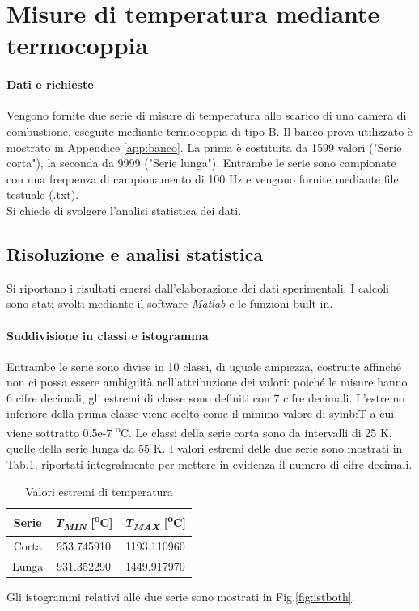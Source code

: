 \section{Misure di temperatura mediante termocoppia} \label{sez:misureT}
\paragraph{Dati e richieste}
Vengono fornite due serie di misure di temperatura allo scarico di una camera di combustione, eseguite mediante termocoppia di tipo B. Il banco prova utilizzato è mostrato in Appendice \ref{app:banco}. La prima è costituita da 1599 valori ("Serie corta"), la seconda da 9999 ("Serie lunga"). Entrambe le serie sono campionate con una frequenza di campionamento di 100 Hz e vengono fornite mediante file testuale (.txt).\\
Si chiede di svolgere l'analisi statistica dei dati.
\subsection{Risoluzione e analisi statistica}
Si riportano i risultati emersi dall'elaborazione dei dati sperimentali. I calcoli sono stati svolti mediante il software \textit{Matlab} e le funzioni built-in.
\paragraph{Suddivisione in classi e istogramma}
Entrambe le serie sono divise in 10 classi, di uguale ampiezza, costruite affinché non ci possa essere ambiguità nell'attribuzione dei valori: poiché le misure hanno 6 cifre decimali, gli estremi di classe sono definiti con 7 cifre decimali. L'estremo inferiore della prima classe viene scelto come il minimo valore di \gls{symb:T} a cui viene sottratto 0.5e-7 \textsuperscript{o}C. Le classi della serie corta sono da intervalli di 25 K, quelle della serie lunga da 55 K. I valori estremi delle due serie sono mostrati in Tab.\ref{tab:estremitemp}, riportati integralmente per mettere in evidenza il numero di cifre decimali.
\begin{table} [H]
	\centering
	\begin{tabular}{c|c|c}
		\toprule
		\toprule
		\textbf{Serie} & \textbf{\textit{T\textsubscript{MIN}} [\textsuperscript{o}C]} &\textbf{\textit{T\textsubscript{MAX}} [\textsuperscript{o}C]} \\
		\midrule
		\midrule
		Corta & 953.745910 & 1193.110960\\
		\midrule
		Lunga & 931.352290 & 1449.917970 \\
		\bottomrule
		\bottomrule
	\end{tabular}
\caption{Valori estremi di temperatura}
\label{tab:estremitemp}
\end{table}
Gli istogrammi relativi alle due serie sono mostrati in Fig.\ref{fig:istboth}.


